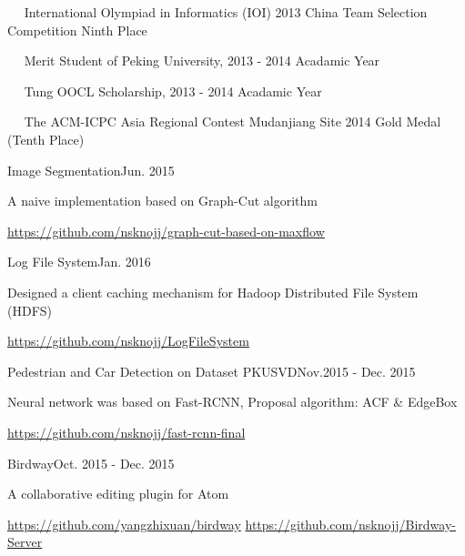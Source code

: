 \documentclass{joel_cv}
\begin{document}

%
%

\begin{description}{}
	\item{\ \ } International Olympiad in Informatics (IOI) 2013 China Team Selection Competition Ninth Place
	\item{\ \ } Merit Student of Peking University, 2013 - 2014 Acadamic Year
	\item{\ \ } Tung OOCL Scholarship, 2013 - 2014 Acadamic Year
	\item{\ \ } The ACM-ICPC Asia Regional Contest Mudanjiang Site 2014 Gold Medal (Tenth Place)
\end{description}


%
%


\begin{sectionContentSimple}{Image Segmentation}{Jun. 2015}
\item A naive implementation based on Graph-Cut algorithm
\item \url{https://github.com/nsknojj/graph-cut-based-on-maxflow}
\end{sectionContentSimple}

\begin{sectionContentSimple}{Log File System}{Jan. 2016}
\item Designed a client caching mechanism for Hadoop Distributed File System (HDFS)
\item \url{https://github.com/nsknojj/LogFileSystem}
\end{sectionContentSimple}

\begin{sectionContentSimple}{Pedestrian and Car Detection on Dataset PKUSVD}{Nov.2015 - Dec. 2015}
\item Neural network was based on Fast-RCNN, Proposal algorithm: ACF \& EdgeBox
\item \url{https://github.com/nsknojj/fast-rcnn-final}
\end{sectionContentSimple}

\begin{sectionContentSimple}{Birdway}{Oct. 2015 - Dec. 2015}
\item A collaborative editing plugin for Atom
\item \url{https://github.com/yangzhixuan/birdway} \quad \url{https://github.com/nsknojj/Birdway-Server}
\end{sectionContentSimple}

%
%

\end{document}
